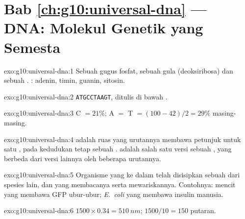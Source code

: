 \section*{Bab \ref{ch:g10:universal-dna} --- DNA: Molekul Genetik yang Semesta}

\begin{solution}{exo:g10:universal-dna:1}
Sebuah gugus fosfat, sebuah gula (deoksiribosa) dan sebuah .
: adenin, timin, guanin, sitosin.
\end{solution}

\begin{solution}{exo:g10:universal-dna:2}
\texttt{ATGCCTAAGT}, ditulis  di bawah .
\end{solution}

\begin{solution}{exo:g10:universal-dna:3}
C $= 21\%$; A $=$ T $= (100 - 42)/2 = 29\%$ masing-masing.
\end{solution}

\begin{solution}{exo:g10:universal-dna:4}
 adalah ruas  yang urutannya membawa petunjuk untuk satu ,
pada kedudukan tetap sebuah .  adalah salah satu versi
sebuah , yang berbeda dari versi lainnya oleh beberapa 
urutannya.
\end{solution}

\begin{solution}{exo:g10:universal-dna:5}
Organisme yang ke dalam  telah disisipkan sebuah  dari
spesies lain, dan yang membacanya serta mewariskannya. Contohnya:
mencit yang membawa  GFP ubur-ubur; \emph{E.~coli} yang membawa  insulin manusia.
\end{solution}

\begin{solution}{exo:g10:universal-dna:6}
$1500 \times 0.34 = \qty{510}{nm}$; $1500/10 = 150$ putaran.
\end{solution}

